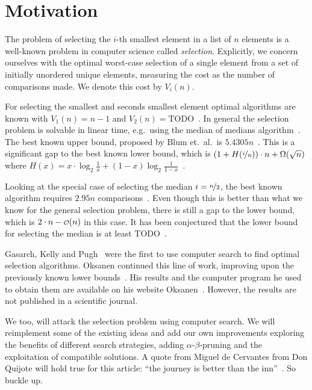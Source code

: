 \documentclass[twoside,leqno,twocolumn]{article}
\newcommand\smallO{
\mathchoice
{{\scriptstyle\mathcal{O}}}%
{{\scriptstyle\mathcal{O}}}%
{{\scriptscriptstyle\mathcal{O}}}%
{\scalebox{.50}{$\scriptscriptstyle\mathcal{O}$}}%
}
\begin{document}
\section{Motivation} \label{sec:motivation}

The problem of selecting the $i$-th smallest element in a list of $n$ elements is a well-known problem in computer science called \textit{selection}.
Explicitly, we concern ourselves with the optimal worst-case selection of a single element from a set of initially unordered unique elements, measuring the cost as the number of comparisons made.
We denote this cost by $V_i(n)$.

For selecting the smallest and seconds smallest element optimal algorithms are known with $V_1(n) = n - 1$ and $V_2(n) = \text{TODO}$~\cite{todo}.
In general the selection problem is solvable in linear time, e.g.\ using the median of medians algorithm~\cite{todo}.
The best known upper bound, proposed by Blum et.\ al.\ is $5.4305n$~\cite{todo}.
This is a significant gap to the best known lower bound, which is $\left (1 + H(\nicefrac{i}{n}) \right ) \cdot n + \Omega(\sqrt n)$ where $H(x) = x \cdot \log_2 \frac{1}{x} + (1 - x) \log_2 \frac{1}{1 - x}$~\cite{todo}.

Looking at the special case of selecting the median $i = \nicefrac{n}{2}$, the best known algorithm requires $2.95n$ comparisons~\cite{dor1999selecting}.
Even though this is better than what we know for the general selection problem, there is still a gap to the lower bound, which is $2 \cdot n - \smallO(n)$ in this case.
It has been conjectured that the lower bound for selecting the median is at least TODO~\cite{todo}.

Gasarch, Kelly and Pugh~\cite{Gasarch1996} were the first to use computer search to find optimal selection algorithms.
Oksanen continued this line of work, improving upon the previously known lower bounds~\cite{Oksanen2006}.
His results and the computer program he used to obtain them are available on his website Oksanen~\cite{Oksanen}.
However, the results are not published in a scientific journal.%

We too, will attack the selection problem using computer search.
We will reimplement some of the existing ideas and add our own improvements exploring the benefits of different search strategies, adding $\alpha$-$\beta$-pruning and the exploitation of compatible solutions.
A quote from Miguel de Cervantes from Don Quijote will hold true for this article: ``the journey is better than the inn''~\cite{cervantes_don_quijote}.
So buckle up.
\end{document}
